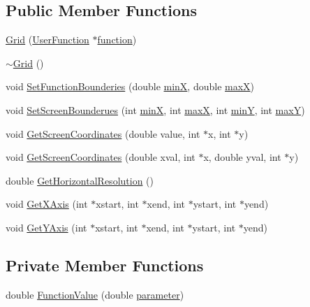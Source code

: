 \subsection*{Public Member Functions}
\begin{DoxyCompactItemize}
\item 
\hyperlink{classGrid_af3a182cffb3b2f18ab0de9fb0184c3ca}{Grid} (\hyperlink{classUserFunction}{User\+Function} $\ast$\hyperlink{classGrid_a69d704fb7924b50175b937798fe6d67d}{function})
\item 
\hyperlink{classGrid_a3661d0a7f998caaaf8627d7a67072116}{$\sim$\+Grid} ()
\item 
void \hyperlink{classGrid_ace057fbd3a401428399996eec3cb1577}{Set\+Function\+Bounderies} (double \hyperlink{classGrid_a70c775fad6a2cfa910a7e1f8c5b3e9b2}{minX}, double \hyperlink{classGrid_ad093fee95a663d4b82c85bea9a1241ec}{maxX})
\item 
void \hyperlink{classGrid_ac5386f4f62d3aae6a518fa11d25c7e59}{Set\+Screen\+Bounderues} (int \hyperlink{classGrid_a70c775fad6a2cfa910a7e1f8c5b3e9b2}{minX}, int \hyperlink{classGrid_ad093fee95a663d4b82c85bea9a1241ec}{maxX}, int \hyperlink{classGrid_af592907852d983fe13ef9581ffd77e6b}{minY}, int \hyperlink{classGrid_acca4c514021d9f6733579b699ac68436}{maxY})
\item 
void \hyperlink{classGrid_a430009c581ae9350ec310f63c1b89140}{Get\+Screen\+Coordinates} (double value, int $\ast$x, int $\ast$y)
\item 
void \hyperlink{classGrid_a4a708195cc7b75e134be0c25adac662e}{Get\+Screen\+Coordinates} (double xval, int $\ast$x, double yval, int $\ast$y)
\item 
double \hyperlink{classGrid_a9fa683c5f40922b5da39c647c4f4622d}{Get\+Horizontal\+Resolution} ()
\item 
void \hyperlink{classGrid_aa399e261008779d3d8c442959b1bafaa}{Get\+X\+Axis} (int $\ast$xstart, int $\ast$xend, int $\ast$ystart, int $\ast$yend)
\item 
void \hyperlink{classGrid_a2d97a1b941c705d7e803f90d59024de7}{Get\+Y\+Axis} (int $\ast$xstart, int $\ast$xend, int $\ast$ystart, int $\ast$yend)
\end{DoxyCompactItemize}
\subsection*{Private Member Functions}
\begin{DoxyCompactItemize}
\item 
double \hyperlink{classGrid_a9e403482f403a28e3a152b435526829b}{Function\+Value} (double \hyperlink{classGrid_a37df3261f985852f871847769c8b833c}{parameter})
\end{DoxyCompactItemize}
